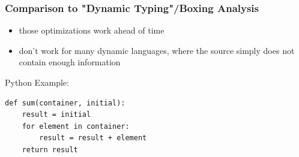 \documentclass[utf8x]{beamer}
\begin{document}
\begin{frame}[containsverbatim]
  \frametitle{Comparison to "Dynamic Typing"/Boxing Analysis}
  \begin{itemize}
      \item those optimizations work ahead of time
      \item don't work for many dynamic languages, where the source simply does not contain enough information
  \end{itemize}
  
  \begin{block}{Python Example:}
  \begin{verbatim}
def sum(container, initial):
    result = initial
    for element in container:
        result = result + element
    return result
  \end{verbatim}
  \end{block}
\end{frame}
\end{document}
